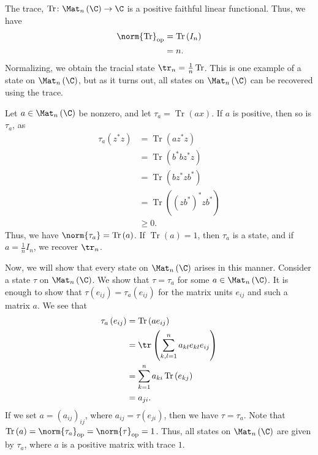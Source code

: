 \documentclass[10pt]{mypackage}
\DeclareMathOperator{\op}{op}
\DeclareMathOperator{\Tr}{Tr}
\begin{document}
\begin{example}
  The trace, $\Tr\colon \Mat_n\left(\C\right)\rightarrow \C$ is a positive faithful linear functional. Thus, we have
  \begin{align*}
    \norm{\Tr}_{\op} &= \Tr\left(I_n\right)\\
                     &= n.
  \end{align*}
  Normalizing, we obtain the tracial state $\tr_n = \frac{1}{n}\Tr$. This is one example of a state on $\Mat_n\left(\C\right)$, but as it turns out, all states on $\Mat_n\left(\C\right)$ can be recovered using the trace.\newline

  Let $a\in \Mat_n\left(\C\right)$ be nonzero, and let $\tau_{a} = \Tr\left(ax\right)$. If $a$ is positive, then so is $\tau_{a}$, as
  \begin{align*}
    \tau_a\left(z^{\ast}z\right) &= \Tr\left(az^{\ast}z\right)\\
                                 &= \Tr\left(b^{\ast}bz^{\ast}z\right)\\
                                 &= \Tr\left(bz^{\ast}zb^{\ast}\right)\\
                                 &= \Tr\left(\left(zb^{\ast}\right)^{\ast}zb^{\ast}\right)\\
                                 &\geq 0.
  \end{align*}
  Thus, we have $\norm{\tau_a} = \Tr\left(a\right)$. If $\Tr\left(a\right) = 1$, then $\tau_a$ is a state, and if $a = \frac{1}{n}I_n$, we recover $\tr_n$.\newline

  Now, we will show that every state on $\Mat_n\left(\C\right)$ arises in this manner. Consider a state $\tau$ on $\Mat_n\left(\C\right)$. We show that $\tau = \tau_a$ for some $a\in \Mat_n\left(\C\right)$. It is enough to show that $\tau\left(e_{ij}\right) = \tau_a\left(e_{ij}\right)$ for the matrix units $e_{ij}$ and such a matrix $a$. We see that
  \begin{align*}
    \tau_a\left(e_{ij}\right) &= \Tr\left(ae_{ij}\right)\\
                              &= \tr\left(\sum_{k,l=1}^{n}a_{kl}e_{kl}e_{ij}\right)\\
                              &= \sum_{k=1}^{n}a_{ki}\Tr\left(e_{kj}\right)\\
                              &= a_{ji}.
  \end{align*}
  If we set $a = \left(a_{ij}\right)_{ij}$, where $a_{ij} = \tau\left(e_{ji}\right)$, then we have $\tau = \tau_{a}$. Note that $\Tr\left(a\right) = \norm{\tau_{a}}_{\op} = \norm{\tau}_{\op} = 1$. Thus, all states on $\Mat_n\left(\C\right)$ are given by $\tau_a$, where $a$ is a positive matrix with trace $1$.
\end{example}
\end{document}
